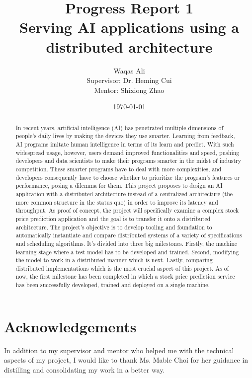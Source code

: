 \documentclass{report}
\title{Progress Report 1 \\ Serving AI applications using a distributed architecture}
\author{Waqas Ali\\{\small Supervisor: Dr. Heming Cui}\\{\small Mentor: Shixiong Zhao}}
\date{\today}
\def\frontmatter{%
    \pagenumbering{roman}
    \setcounter{page}{1}
    \renewcommand{\thesection}{\Roman{section}}
}%
\begin{document}
\maketitle

\frontmatter

\begin{abstract}
\thispagestyle{plain}

In recent years, artificial intelligence (AI) has penetrated multiple dimensions of people's daily lives by making the devices they use smarter. Learning from feedback, AI programs imitate human intelligence in terms of its learn and predict. With such widespread usage, however, users demand improved functionalities and speed, pushing developers and data scientists to make their programs smarter in the midst of industry competition. These smarter programs have to deal with more complexities, and developers consequently have to choose whether to prioritize the program's features or performance, posing a dilemma for them. This project proposes to design an AI application with a distributed architecture instead of a centralized architecture (the more common structure in the status quo) in order to improve its latency and throughput. As proof of concept, the project will specifically examine a complex stock price prediction application and the goal is to transfer it onto a distributed architecture. The project's objective is to develop tooling and foundation to automatically instantiate and compare distributed systems of a variety of specifications and scheduling algorithms. It's divided into three big milestones. Firstly, the machine learning stage where a test model has to be developed and trained. Second, modifying the model to work in a distributed manner which is next. Lastly, comparing distributed implementations which is the most crucial aspect of this project. As of now, the first milestone has been completed in which a stock price prediction service has been successfully developed, trained and deployed on a single machine.
\end{abstract}

\section*{Acknowledgements}
In addition to my supervisor and mentor who helped me with the technical aspects of my project, I would like to thank Ms. Mable Choi for her guidance in distilling and consolidating my work in a better way.
\end{document}
